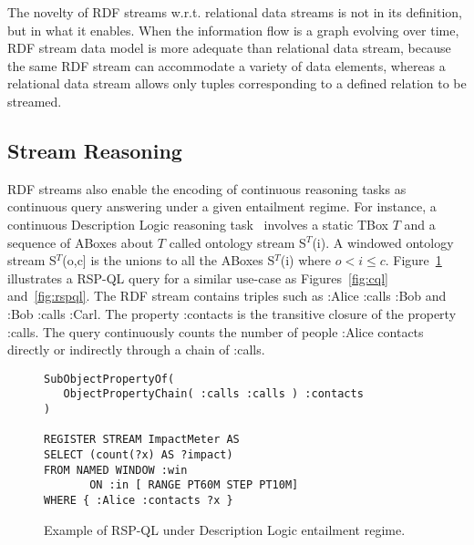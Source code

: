 The novelty of RDF streams w.r.t. relational data streams is not in its definition, but in what it enables. When the information flow is a graph evolving over time, RDF stream data model is more adequate than relational data stream, because the same RDF stream can accommodate a variety of data elements, whereas a relational data stream allows only tuples corresponding to a defined relation to be streamed. 

\subsection{Stream Reasoning}\label{sec:sr} %

RDF streams also enable the encoding of continuous reasoning tasks as continuous query answering under a given entailment regime. For instance, a continuous Description Logic reasoning task~\cite{Walavalkar2008} involves 
a static TBox $T$ and a sequence of ABoxes about $T$ called
ontology stream S$^T$(i).
A windowed ontology stream S$^T$(o,c] is the unions to all the ABoxes
S$^T$(i) where $o<i\leq c$.
Figure~\ref{fig:sr} illustrates a RSP-QL query for a similar use-case as Figures~\ref{fig:cql} and~\ref{fig:rspql}. The RDF stream contains triples such as \textsf{:Alice :calls :Bob} and \textsf{:Bob :calls :Carl}. The property \textsf{:contacts} is the transitive closure of the property \textsf{:calls}. The query continuously counts the number of people \textsf{:Alice} contacts directly or indirectly through a chain of \textsf{:calls}.

\begin{figure}[!h]
\begin{lstlisting}[language=rsp-ql]
SubObjectPropertyOf( 
   ObjectPropertyChain( :calls :calls ) :contacts 
)

REGISTER STREAM ImpactMeter AS
SELECT (count(?x) AS ?impact)
FROM NAMED WINDOW :win 
       ON :in [ RANGE PT60M STEP PT10M]
WHERE { :Alice :contacts ?x }
\end{lstlisting}
\vspace*{-4mm}
\caption{\label{fig:sr}Example of RSP-QL under Description Logic entailment regime.}
\end{figure}

